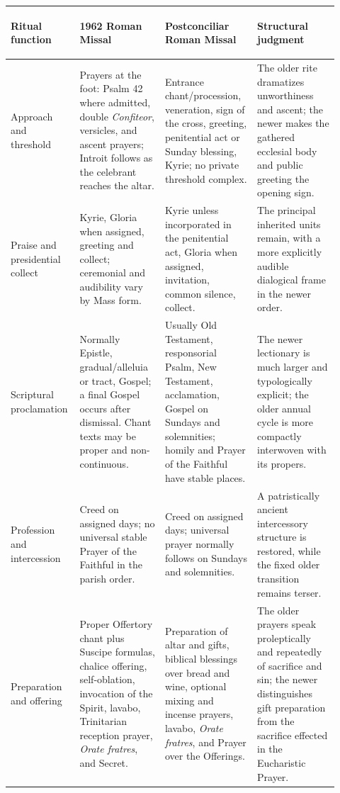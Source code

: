 \begin{longtable}{>{\bfseries\raggedright\arraybackslash}p{0.16\linewidth}>{\raggedright\arraybackslash}p{0.25\linewidth}>{\raggedright\arraybackslash}p{0.27\linewidth}>{\raggedright\arraybackslash}p{0.24\linewidth}}
\toprule
\textbf{Ritual function} & \textbf{1962 Roman Missal} & \textbf{Postconciliar Roman Missal} & \textbf{Structural judgment}\\
\midrule
\endhead
Approach and threshold & Prayers at the foot: Psalm 42 where admitted, double \emph{Confiteor}, versicles, and ascent prayers; Introit follows as the celebrant reaches the altar. & Entrance chant/procession, veneration, sign of the cross, greeting, penitential act or Sunday blessing, Kyrie; no private threshold complex. & The older rite dramatizes unworthiness and ascent; the newer makes the gathered ecclesial body and public greeting the opening sign.\\
Praise and presidential collect & Kyrie, Gloria when assigned, greeting and collect; ceremonial and audibility vary by Mass form. & Kyrie unless incorporated in the penitential act, Gloria when assigned, invitation, common silence, collect. & The principal inherited units remain, with a more explicitly audible dialogical frame in the newer order.\\
Scriptural proclamation & Normally Epistle, gradual/alleluia or tract, Gospel; a final Gospel occurs after dismissal. Chant texts may be proper and non-continuous. & Usually Old Testament, responsorial Psalm, New Testament, acclamation, Gospel on Sundays and solemnities; homily and Prayer of the Faithful have stable places. & The newer lectionary is much larger and typologically explicit; the older annual cycle is more compactly interwoven with its propers.\\
Profession and intercession & Creed on assigned days; no universal stable Prayer of the Faithful in the parish order. & Creed on assigned days; universal prayer normally follows on Sundays and solemnities. & A patristically ancient intercessory structure is restored, while the fixed older transition remains terser.\\
Preparation and offering & Proper Offertory chant plus Suscipe formulas, chalice offering, self-oblation, invocation of the Spirit, lavabo, Trinitarian reception prayer, \emph{Orate fratres}, and Secret. & Preparation of altar and gifts, biblical blessings over bread and wine, optional mixing and incense prayers, lavabo, \emph{Orate fratres}, and Prayer over the Offerings. & The older prayers speak proleptically and repeatedly of sacrifice and sin; the newer distinguishes gift preparation from the sacrifice effected in the Eucharistic Prayer.\\

\end{longtable}
